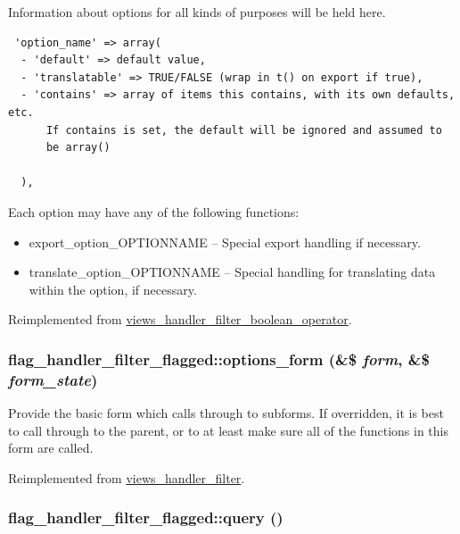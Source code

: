 Information about options for all kinds of purposes will be held here. 

\begin{Code}\begin{verbatim} 'option_name' => array(
  - 'default' => default value,
  - 'translatable' => TRUE/FALSE (wrap in t() on export if true),
  - 'contains' => array of items this contains, with its own defaults, etc.
      If contains is set, the default will be ignored and assumed to
      be array()

  ),
\end{verbatim}
\end{Code}

 Each option may have any of the following functions:\begin{itemize}
\item export\_\-option\_\-OPTIONNAME -- Special export handling if necessary.\item translate\_\-option\_\-OPTIONNAME -- Special handling for translating data within the option, if necessary. \end{itemize}


Reimplemented from \hyperlink{classviews__handler__filter__boolean__operator_f2103bf9a481a2a2eb4d5c0e6baf2b77}{views\_\-handler\_\-filter\_\-boolean\_\-operator}.\hypertarget{classflag__handler__filter__flagged_705ed46853eba0fb4b4eb461de5264db}{
\subsubsection[{options\_\-form}]{\setlength{\rightskip}{0pt plus 5cm}flag\_\-handler\_\-filter\_\-flagged::options\_\-form (\&\$ {\em form}, \/  \&\$ {\em form\_\-state})}}
\label{classflag__handler__filter__flagged_705ed46853eba0fb4b4eb461de5264db}


Provide the basic form which calls through to subforms. If overridden, it is best to call through to the parent, or to at least make sure all of the functions in this form are called. 

Reimplemented from \hyperlink{classviews__handler__filter_f14c69367162057a32709a6340de0988}{views\_\-handler\_\-filter}.\hypertarget{classflag__handler__filter__flagged_c01506ba4593bc1ab5b7b40f89843e82}{
\subsubsection[{query}]{\setlength{\rightskip}{0pt plus 5cm}flag\_\-handler\_\-filter\_\-flagged::query ()}}
\label{classflag__handler__filter__flagged_c01506ba4593bc1ab5b7b40f89843e82}


